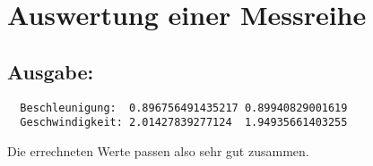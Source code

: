 \section{Auswertung einer Messreihe}



\subsection*{Ausgabe:}
\begin{lstlisting}
  Beschleunigung:  0.896756491435217 0.89940829001619
  Geschwindigkeit: 2.01427839277124  1.94935661403255
\end{lstlisting}
Die errechneten Werte passen also sehr gut zusammen.

